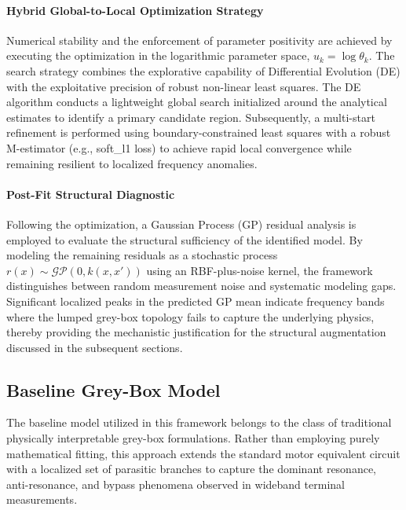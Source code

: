 \documentclass[12pt,a4paper]{article}
\begin{document}
\paragraph{Hybrid Global-to-Local Optimization Strategy}
Numerical stability and the enforcement of parameter positivity are achieved by executing the optimization in the logarithmic parameter space, $u_k = \log \theta_k$. The search strategy combines the explorative capability of Differential Evolution (DE) with the exploitative precision of robust non-linear least squares. The DE algorithm conducts a lightweight global search initialized around the analytical estimates to identify a primary candidate region. Subsequently, a multi-start refinement is performed using boundary-constrained least squares with a robust M-estimator (e.g., soft\_l1 loss) to achieve rapid local convergence while remaining resilient to localized frequency anomalies\cite{ref12,ref13,ref38,ref40,ref52}.

\paragraph{Post-Fit Structural Diagnostic}
Following the optimization, a Gaussian Process (GP) residual analysis is employed to evaluate the structural sufficiency of the identified model. By modeling the remaining residuals as a stochastic process $r(x) \sim \mathcal{GP}(0, k(x, x'))$ using an RBF-plus-noise kernel, the framework distinguishes between random measurement noise and systematic modeling gaps. Significant localized peaks in the predicted GP mean indicate frequency bands where the lumped grey-box topology fails to capture the underlying physics, thereby providing the mechanistic justification for the structural augmentation discussed in the subsequent sections.

\subsection{Baseline Grey-Box Model}

The baseline model utilized in this framework belongs to the class of traditional physically interpretable grey-box formulations. Rather than employing purely mathematical fitting, this approach extends the standard motor equivalent circuit with a localized set of parasitic branches to capture the dominant resonance, anti-resonance, and bypass phenomena observed in wideband terminal measurements\cite{ref12,ref13,ref23,ref40,ref52}.
\end{document}
